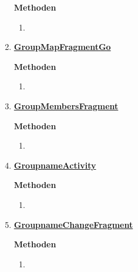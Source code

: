 \begin{enumerate}
	\textbf{Methoden}
	\begin{enumerate}
		\item \underline{}
		
	\end{enumerate}

	\item \textbf{\underline{GroupMapFragmentGo}}

	
	\textbf{Methoden}
	\begin{enumerate}
		\item \underline{}
		
	\end{enumerate}

	\item \textbf{\underline{GroupMembersFragment}}
	
	
	\textbf{Methoden}
	\begin{enumerate}
		\item \underline{}
		
	\end{enumerate}

	\item \textbf{\underline{GroupnameActivity}}
	
	
	\textbf{Methoden}
	\begin{enumerate}
		\item \underline{}
		
	\end{enumerate}
	
	\item \textbf{\underline{GroupnameChangeFragment}}
	
	
	\textbf{Methoden}	
	\begin{enumerate}
		\item \underline{}
		

\end{enumerate}
\end{enumerate}
